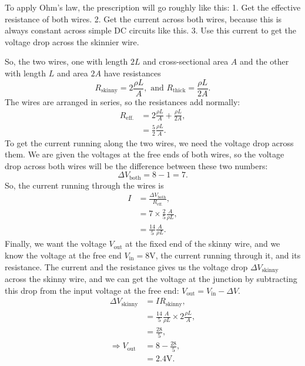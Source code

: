 \documentclass[11pt]{paper}
\begin{document}
To apply Ohm's law, the prescription will go roughly like this: 1. Get the effective resistance of both wires. 2. Get the current across both wires, because this is always constant across simple DC circuits like this.  3. Use this current to get the voltage drop across the skinnier wire.

So, the two wires, one with length $2L$ and cross-sectional area $A$ and the other with length $L$ and area $2A$ have resistances
\begin{equation}
	R_\text{skinny} = 2\frac{\rho L}{A}, \text{ and } R_\text{thick} = \frac{\rho L}{2A}.
\end{equation}
The wires are arranged in series, so the resistances add normally:
\begin{align}
	R_\text{eff.} &= 2\frac{\rho L}{A} + \frac{\rho L}{2A},\\
	&=\frac{5}{2}\frac{\rho L}{A}.
\end{align}
To get the current running along the two wires, we need the voltage drop across them.  We are given the voltages at the free ends of both wires, so the voltage drop across both wires will be the difference between these two numbers:
\begin{equation}
	\Delta V_\text{both} = 8-1 = 7.
\end{equation}
So, the current running through the wires is
\begin{align}
	I &= \frac{\Delta V_\text{both}}{R_\text{eff.}},\\
	&= 7\times\frac{2}{5}\frac{A}{\rho L},\\
	&= \frac{14}{5}\frac{A}{\rho L}.
\end{align}
Finally, we want the voltage $V_\text{out}$ at the fixed end of the skinny wire, and we know the voltage at the free end $V_\text{in} = 8 \text{V}$, the current running through it, and its resistance.  The current and the resistance gives us the voltage drop $\Delta V_\text{skinny}$ across the skinny wire, and we can get the voltage at the junction by subtracting this drop from the input voltage at the free end: $V_\text{out} = V_\text{in}-\Delta V$.
\begin{align}
	\Delta V_\text{skinny} &= IR_\text{skinny},\\
	&= \frac{14}{5}\frac{A}{\rho L}\times 2\frac{\rho L}{A},\\
	&= \frac{28}{5},\\
	\Rightarrow V_\text{out} &= 8-\frac{28}{5},\\
	&= 2.4 \text{V}.
\end{align}
\end{document}
